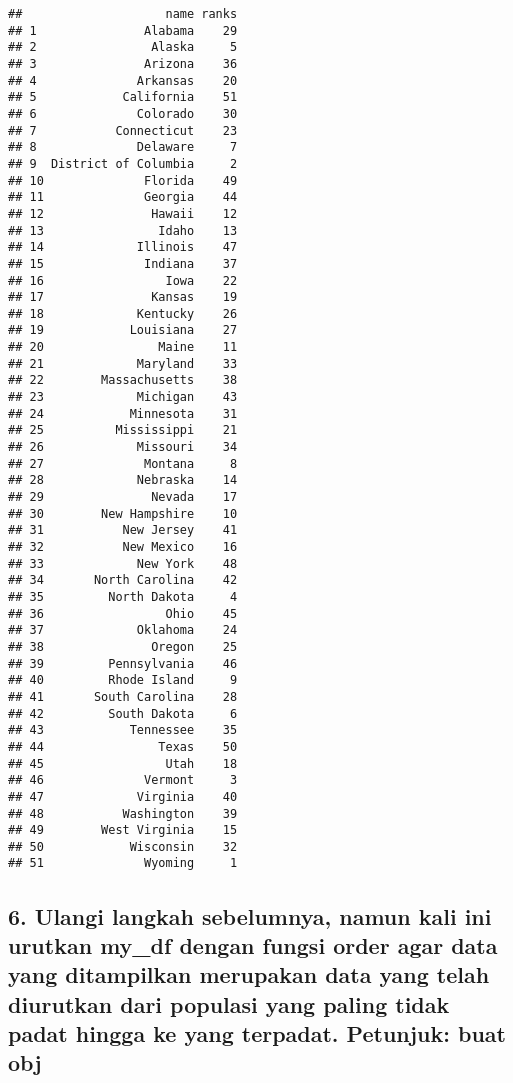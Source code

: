 \documentclass[
]{article}
\begin{document}
\begin{verbatim}
##                    name ranks
## 1               Alabama    29
## 2                Alaska     5
## 3               Arizona    36
## 4              Arkansas    20
## 5            California    51
## 6              Colorado    30
## 7           Connecticut    23
## 8              Delaware     7
## 9  District of Columbia     2
## 10              Florida    49
## 11              Georgia    44
## 12               Hawaii    12
## 13                Idaho    13
## 14             Illinois    47
## 15              Indiana    37
## 16                 Iowa    22
## 17               Kansas    19
## 18             Kentucky    26
## 19            Louisiana    27
## 20                Maine    11
## 21             Maryland    33
## 22        Massachusetts    38
## 23             Michigan    43
## 24            Minnesota    31
## 25          Mississippi    21
## 26             Missouri    34
## 27              Montana     8
## 28             Nebraska    14
## 29               Nevada    17
## 30        New Hampshire    10
## 31           New Jersey    41
## 32           New Mexico    16
## 33             New York    48
## 34       North Carolina    42
## 35         North Dakota     4
## 36                 Ohio    45
## 37             Oklahoma    24
## 38               Oregon    25
## 39         Pennsylvania    46
## 40         Rhode Island     9
## 41       South Carolina    28
## 42         South Dakota     6
## 43            Tennessee    35
## 44                Texas    50
## 45                 Utah    18
## 46              Vermont     3
## 47             Virginia    40
## 48           Washington    39
## 49        West Virginia    15
## 50            Wisconsin    32
## 51              Wyoming     1
\end{verbatim}

\hypertarget{ulangi-langkah-sebelumnya-namun-kali-ini-urutkan-my_df-dengan-fungsi-order-agar-data-yang-ditampilkan-merupakan-data-yang-telah-diurutkan-dari-populasi-yang-paling-tidak-padat-hingga-ke-yang-terpadat.-petunjuk-buat-obj}{%
\subsection{6. Ulangi langkah sebelumnya, namun kali ini urutkan my\_df
dengan fungsi order agar data yang ditampilkan merupakan data yang telah
diurutkan dari populasi yang paling tidak padat hingga ke yang terpadat.
Petunjuk: buat
obj}\label{ulangi-langkah-sebelumnya-namun-kali-ini-urutkan-my_df-dengan-fungsi-order-agar-data-yang-ditampilkan-merupakan-data-yang-telah-diurutkan-dari-populasi-yang-paling-tidak-padat-hingga-ke-yang-terpadat.-petunjuk-buat-obj}}
\end{document}
